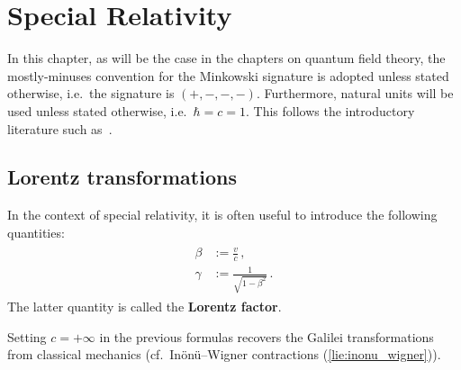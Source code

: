 \chapter{Special Relativity}\label{chapter:special_relativity}

    In this chapter, as will be the case in the chapters on quantum field theory, the mostly-minuses convention for the Minkowski signature is adopted unless stated otherwise, i.e.~the signature is $(+,-,-,-)$. Furthermore, natural units will be used unless stated otherwise, i.e.~$\hbar = c = 1$. This follows the introductory literature such as~\citet{greiner_field_1996,peskin_introduction_1995}.

    \minitoc

\section{Lorentz transformations}

    \begin{notation}
        In the context of special relativity, it is often useful to introduce the following quantities:
        \begin{gather}
            \label{relativity:lorentz_factor}
            \begin{aligned}
                \beta &:= \frac{v}{c}\,,\\
                \gamma &:= \frac{1}{\sqrt{1 - \beta^2}}\,.
            \end{aligned}
        \end{gather}
        The latter quantity is called the \textbf{Lorentz factor}.
    \end{notation}
    \begin{remark}
        Setting $c=+\infty$ in the previous formulas recovers the Galilei transformations from classical mechanics (cf.~In\"on\"u--Wigner contractions (\cref{lie:inonu_wigner})).
    \end{remark}

